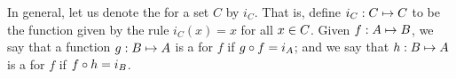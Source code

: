 \documentclass[../main.tex]{subfiles}
\begin{document}
\problem{}\label{s2p5}

In general, let us denote the  for a set \(C\) by
\(i_C\). That is, define \({i_C}: {C} \mapsto{} {C}\) to be the function given by the
rule \(i_C(x) = x\) for all \(x \in C\). Given \({f}: {A} \mapsto{} {B}\), we say
that a function \({g}: {B} \mapsto{} {A}\) is a  for \(f\)
if \({g} \circ{} {f} = i_A\); and we say that \({h}: {B} \mapsto{} {A}\) is a
 for \(f\) if \({f} \circ{} {h} = i_B\).






\end{document}
